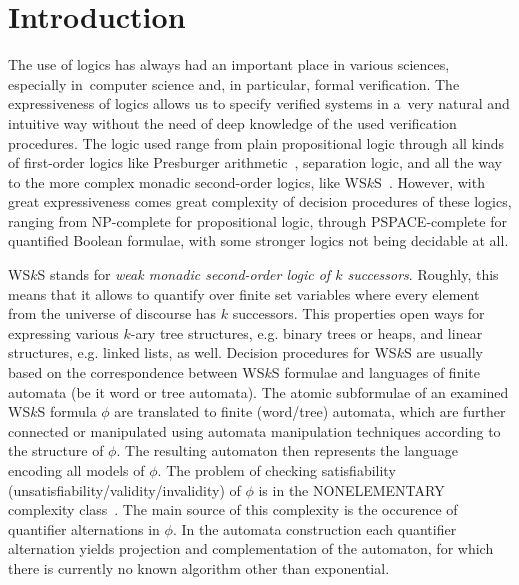 \chapter{Introduction}
 
The use of logics has always had an important place in various sciences,
especially in~computer science and, in particular, formal verification. The
expressiveness of logics allows us to specify verified systems in a~very natural
and intuitive way without the need of deep knowledge of the used verification
procedures. The logic used range from plain propositional logic through all
kinds of first-order logics like Presburger arithmetic~\cite{presburger},
separation logic, and all the way to the more complex monadic second-order
logics, like WS$k$S~\cite{wsks}. However, with great expressiveness comes great
complexity of decision procedures of these logics, ranging from NP-complete for
propositional logic, through PSPACE-complete for quantified Boolean formulae,
with some stronger logics not being decidable at all.

WS$k$S stands for \emph{weak monadic second-order logic of $k$ successors}.
Roughly, this means that it allows to quantify over finite set variables where
every element from the universe of discourse has $k$ successors. This properties
open ways for expressing various $k$-ary tree structures, e.g. binary trees or
heaps, and linear structures, e.g. linked lists, as well. Decision procedures
for WS$k$S are usually based on the correspondence between WS$k$S formulae and
languages of finite automata (be it word or tree automata). The atomic
subformulae of an
examined WS$k$S formula $\phi$ are translated to finite (word/tree)
automata, which are further connected or manipulated using automata manipulation
techniques according to the structure of $\phi$. The resulting automaton then
represents the language encoding all models of $\phi$. The problem of checking
satisfiability (unsatisfiability/validity/invalidity) of $\phi$ is in the
NONELEMENTARY complexity class~\cite{wsksisnonelementary}. The main source of
this complexity is the occurence of quantifier alternations in $\phi$. In the
automata construction each quantifier alternation yields projection and
complementation of the automaton, for which there is currently no known
algorithm other than exponential.

